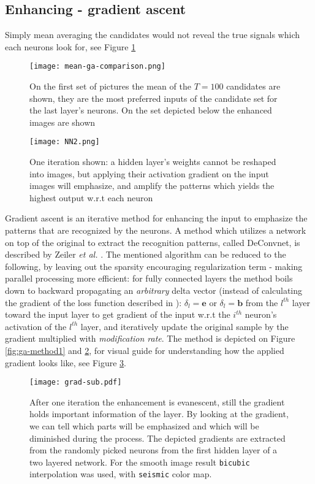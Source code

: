 \subsection{Enhancing - gradient ascent}

Simply mean averaging the candidates would not reveal the true signals which each neurons look for, see Figure \ref{fig:mean-ga-comp}

\begin{figure}
    \centering
    \texttt{[image: mean-ga-comparison.png]}
    \caption{On the first set of pictures the mean of the $T=100$ candidates are shown, they are the most preferred inputs of the candidate set for the last layer's neurons. On the set depicted below the enhanced images are shown}
    \label{fig:mean-ga-comp}
\end{figure}
\begin{figure}
    \centering
    \texttt{[image: NN2.png]}
    \caption{One iteration shown: a hidden layer's weights cannot be reshaped into images, but applying their activation gradient on the input images will emphasize, and amplify the patterns which yields the highest output w.r.t each neuron}
    \label{fig:ga-method2}
\end{figure}
Gradient ascent is an iterative method for enhancing the input to emphasize the patterns that are recognized by the neurons. A method which utilizes a network on top of the original to extract the recognition patterns, called DeConvnet, is described by Zeiler \emph{et al.} \cite{zeiler2014visualizing}. The mentioned algorithm can be reduced to the following, by leaving out the sparsity encouraging regularization term - making parallel processing more efficient:
for fully connected layers the method boils down to backward propagating an \emph{arbitrary} delta vector (instead of calculating the gradient of the loss function described in \cite{zeiler2014visualizing}): 
$\delta_l = \mathbf{e}$ or $\delta_l =\mathbf{b}$
from the $l^{th}$ layer toward the input layer to get gradient of the input w.r.t the $i^{th}$ neuron's activation of the $l^{th}$ layer, and iteratively update the original sample by the gradient multiplied with \emph{modification rate}. The method is depicted on Figure \ref{fig:ga-method1} and \ref{fig:ga-method2}, 
for visual guide for understanding how the applied gradient looks like, see Figure \ref{fig:grad-sub}.

\begin{figure}
    \centering
    \texttt{[image: grad-sub.pdf]}
    \caption{After one iteration the enhancement is evanescent, still the gradient holds important information of the layer.
    By looking at the gradient, we can tell which parts will be emphasized and which will be diminished during the process.
    The depicted gradients are extracted from the randomly picked neurons from the first hidden layer of a two layered network.
    For the smooth image result \texttt{bicubic} interpolation was used, with \texttt{seismic} color map.
    }
    \label{fig:grad-sub}
\end{figure}


